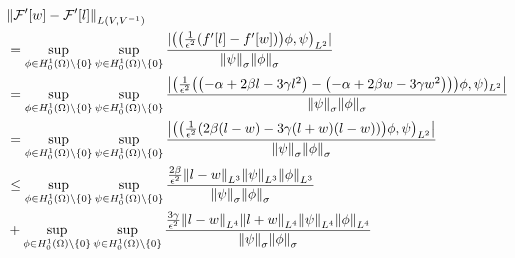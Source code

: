 \begin{align}
  &\norm{\mathcal{F}'\qty[w]-\mathcal{F}'\qty[l]}_{L\qty(V,V^{-1})}\\
  &=
  \sup\limits_{\phi \in H^1_0(\Omega) \backslash \{ 0 \} }
  \sup\limits_{\psi \in H^1_0(\Omega) \backslash \{ 0 \} }
  \frac
  {|\qty(\qty(\frac{1}{\epsilon^2}\qty(f^\prime[l]-f^\prime[w]))\phi,\psi)_{L^2}|}
  {\norm{\psi}_\sigma\norm{\phi}_\sigma}\\
  &=
  \sup\limits_{\phi \in H^1_0(\Omega) \backslash \{ 0 \} }
  \sup\limits_{\psi \in H^1_0(\Omega) \backslash \{ 0 \} }
  \frac
  {\qty|\qty(\frac{1}{\epsilon^2}
  \qty(\qty(-\alpha  + 2\beta l - 3\gamma l^2)-\qty(-\alpha  + 2\beta w - 3\gamma w^2)))\phi,\psi)_{L^2}  |}
  {\norm{\psi}_\sigma\norm{\phi}_\sigma}\\
  &=
  \sup\limits_{\phi \in H^1_0(\Omega) \backslash \{ 0 \} }
  \sup\limits_{\psi \in H^1_0(\Omega) \backslash \{ 0 \} }
  \frac
  {\qty|\qty( \qty(\frac{1}{\epsilon^2}
  \qty(2\beta\qty(l-w)-3\gamma\qty(l+w)\qty(l-w)))\phi,\psi )_{L^2}|}
  {\norm{\psi}_\sigma\norm{\phi}_\sigma}\\
  &\leq
  \sup\limits_{\phi \in H^1_0(\Omega) \backslash \{ 0 \} }
  \sup\limits_{\psi \in H^1_0(\Omega) \backslash \{ 0 \} }
  \frac
  {\frac{2\beta}{\epsilon^2}\norm{l-w}_{L^3}
  \norm{\psi}_{L^3}\norm{\phi}_{L^3}}
  {\norm{\psi}_\sigma\norm{\phi}_\sigma}\\
  &+
  \sup\limits_{\phi \in H^1_0(\Omega) \backslash \{ 0 \} }
  \sup\limits_{\psi \in H^1_0(\Omega) \backslash \{ 0 \} }
  \frac
  {\frac{3\gamma}{\epsilon^2}\norm{l-w}_{L^4}\norm{l+w}_{L^4}
  \norm{\psi}_{L^4}\norm{\phi}_{L^4}}
  {\norm{\psi}_\sigma\norm{\phi}_\sigma}\\
\end{align}





